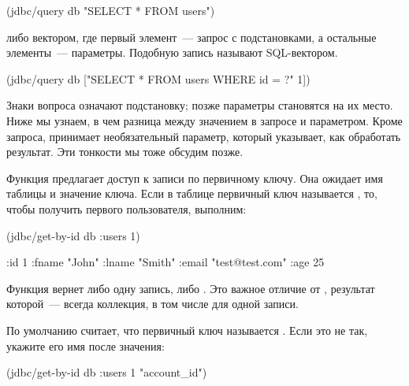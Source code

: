 \begin{english}
  \begin{clojure}
(jdbc/query db "SELECT * FROM users")
  \end{clojure}
\end{english}

\noindent
либо вектором, где первый элемент~--- запрос с подстановками, а остальные элементы~--- параметры. Подобную запись называют SQL-вектором.

\begin{english}
  \begin{clojure}
(jdbc/query db
            ["SELECT * FROM users WHERE id = ?" 1])
  \end{clojure}
\end{english}

Знаки вопроса означают подстановку; позже параметры становятся на их место. Ниже мы узнаем, в чем разница между значением в запросе и параметром. Кроме запроса,  принимает необязательный параметр, который указывает, как обработать результат. Эти тонкости мы тоже обсудим позже.

Функция  предлагает доступ к записи по первичному ключу. Она ожидает имя таблицы и значение ключа. Если в таблице  первичный ключ называется , то, чтобы получить первого пользователя, выполним:

\begin{english}
  \begin{clojure}
(jdbc/get-by-id db :users 1)

{:id 1
 :fname "John"
 :lname "Smith"
 :email "test@test.com"
 :age 25}
  \end{clojure}
\end{english}

Функция вернет либо одну запись, либо . Это важное отличие от , результат которой~--- всегда коллекция, в том числе для одной записи.


По умолчанию  считает, что первичный ключ называется . Если это не так, укажите  его имя после значения:

\begin{english}
  \begin{clojure}
(jdbc/get-by-id db :users 1 "account_id")
  \end{clojure}
\end{english}


